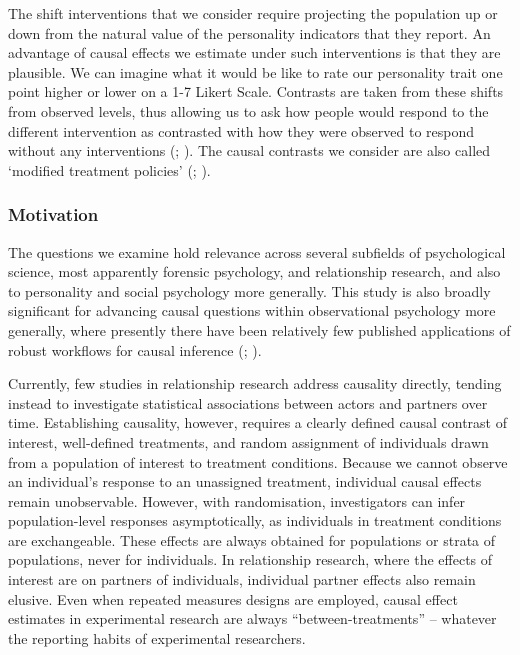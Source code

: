 \documentclass[
  single column]{article}
\begin{document}
The shift interventions that we consider require projecting the
population up or down from the natural value of the personality
indicators that they report. An advantage of causal effects we estimate
under such interventions is that they are plausible. We can imagine what
it would be like to rate our personality trait one point higher or lower
on a 1-7 Likert Scale. Contrasts are taken from these shifts from
observed levels, thus allowing us to ask how people would respond to the
different intervention as contrasted with how they were observed to
respond without any interventions (; ). The causal contrasts we consider are also called
`modified treatment policies' (; ).

\subsubsection{Motivation}\label{motivation}

The questions we examine hold relevance across several subfields of
psychological science, most apparently forensic psychology, and
relationship research, and also to personality and social psychology
more generally. This study is also broadly significant for advancing
causal questions within observational psychology more generally, where
presently there have been relatively few published applications of
robust workflows for causal inference
(;
).

Currently, few studies in relationship research address causality
directly, tending instead to investigate statistical associations
between actors and partners over time. Establishing causality, however,
requires a clearly defined causal contrast of interest, well-defined
treatments, and random assignment of individuals drawn from a population
of interest to treatment conditions. Because we cannot observe an
individual's response to an unassigned treatment, individual causal
effects remain unobservable. However, with randomisation, investigators
can infer population-level responses asymptotically, as individuals in
treatment conditions are exchangeable. These effects are always obtained
for populations or strata of populations, never for individuals. In
relationship research, where the effects of interest are on partners of
individuals, individual partner effects also remain elusive. Even when
repeated measures designs are employed, causal effect estimates in
experimental research are always ``between-treatments'' -- whatever the
reporting habits of experimental researchers.
\end{document}
